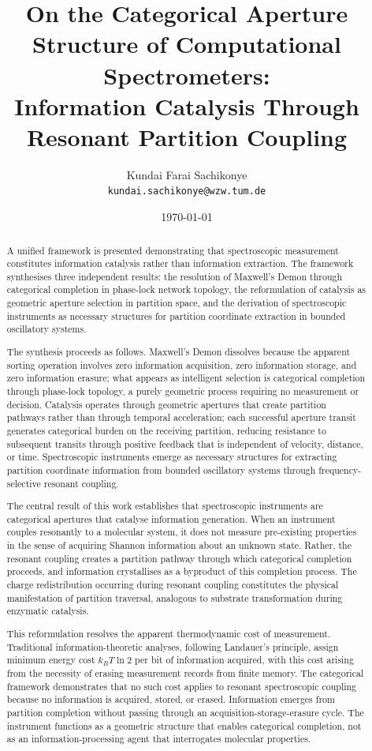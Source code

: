 \documentclass[twocolumn,10pt,a4paper]{article}
\title{\textbf{On the Categorical Aperture Structure of Computational Spectrometers: \\
Information Catalysis Through Resonant Partition Coupling}}
\author{Kundai Farai Sachikonye\\
\texttt{kundai.sachikonye@wzw.tum.de}}
\date{\today}
\theoremstyle{definition}
\theoremstyle{remark}
\begin{document}
\maketitle

\begin{abstract}
A unified framework is presented demonstrating that spectroscopic measurement constitutes information catalysis rather than information extraction. The framework synthesises three independent results: the resolution of Maxwell's Demon through categorical completion in phase-lock network topology, the reformulation of catalysis as geometric aperture selection in partition space, and the derivation of spectroscopic instruments as necessary structures for partition coordinate extraction in bounded oscillatory systems.

The synthesis proceeds as follows. Maxwell's Demon dissolves because the apparent sorting operation involves zero information acquisition, zero information storage, and zero information erasure; what appears as intelligent selection is categorical completion through phase-lock topology, a purely geometric process requiring no measurement or decision. Catalysis operates through geometric apertures that create partition pathways rather than through temporal acceleration; each successful aperture transit generates categorical burden on the receiving partition, reducing resistance to subsequent transits through positive feedback that is independent of velocity, distance, or time. Spectroscopic instruments emerge as necessary structures for extracting partition coordinate information from bounded oscillatory systems through frequency-selective resonant coupling.

The central result of this work establishes that spectroscopic instruments are categorical apertures that catalyse information generation. When an instrument couples resonantly to a molecular system, it does not measure pre-existing properties in the sense of acquiring Shannon information about an unknown state. Rather, the resonant coupling creates a partition pathway through which categorical completion proceeds, and information crystallises as a byproduct of this completion process. The charge redistribution occurring during resonant coupling constitutes the physical manifestation of partition traversal, analogous to substrate transformation during enzymatic catalysis.

This reformulation resolves the apparent thermodynamic cost of measurement. Traditional information-theoretic analyses, following Landauer's principle, assign minimum energy cost $k_B T \ln 2$ per bit of information acquired, with this cost arising from the necessity of erasing measurement records from finite memory. The categorical framework demonstrates that no such cost applies to resonant spectroscopic coupling because no information is acquired, stored, or erased. Information emerges from partition completion without passing through an acquisition-storage-erasure cycle. The instrument functions as a geometric structure that enables categorical completion, not as an information-processing agent that interrogates molecular properties.


\end{abstract}
\end{document}
